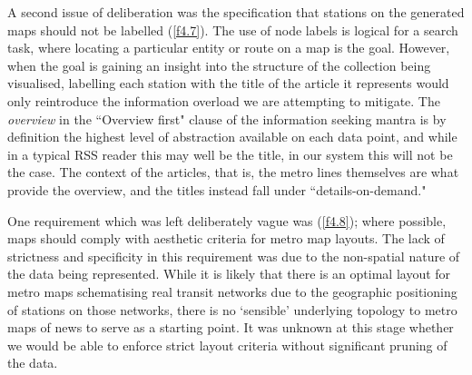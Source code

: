 A second issue of deliberation was the specification that stations on the generated maps should not be labelled (\ref{f4.7}). The use of node labels is logical for a search task, where locating a particular entity or route on a map is the goal. However, when the goal is gaining an insight into the structure of the collection being visualised, labelling each station with the title of the article it represents would only reintroduce the information overload we are attempting to mitigate. The \textit{overview} in the ``Overview first" clause of the information seeking mantra \citep{TheEyesHaveIt} is by definition the highest level of abstraction available on each data point, and while in a typical RSS reader this may well be the title, in our system this will not be the case. The context of the articles, that is, the metro lines themselves are what provide the overview, and the titles instead fall under ``details-on-demand."

One requirement which was left deliberately vague was (\ref{f4.8}); where possible, maps should comply with  aesthetic criteria for metro map layouts. The lack of strictness and specificity in this requirement was due to the non-spatial nature of the data being represented. While it is likely that there is an optimal layout for metro maps schematising real transit networks due to the geographic positioning of stations on those networks, there is no `sensible' underlying topology to metro maps of news to serve as a starting point. It was unknown at this stage whether we would be able to enforce strict layout criteria without significant pruning of the data.



